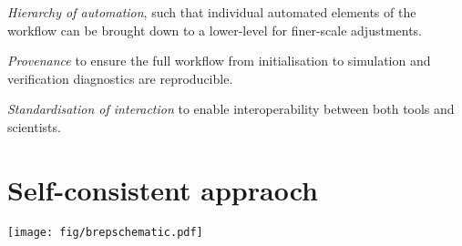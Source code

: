 \documentclass[a4paper, 10pt]{book}
\providecommand{\twod}{two-dimensional\xspace}
\providecommand{\threed}{three-dimensional\xspace}
\begin{document}
\begin{table}[!h]
\begin{minipage}{\columnwidth}
{\begin{tenetenum}[
labelindent=*,
style=multiline,
leftmargin=*,
]
      \emph{Hierarchy of automation}, such that individual automated elements of the workflow
      can be brought down to a lower-level for finer-scale adjustments.
\item \label{tenet:provenance} %
      \emph{Provenance} to ensure the full workflow from initialisation to simulation and
      verification diagnostics are reproducible.
\item \label{tenet:standard} %
      \emph{Standardisation of interaction} to enable interoperability between both tools and scientists.
\end{tenetenum}
\noindent \hrulefill
}
\end{minipage}
\caption{
The nine tenets of geophysical mesh generation.
Solutions to the spatial discretisation of geophysical model domains need to address these nine attributes
\cite[from][]{candybrep}.
}
\label{fig:tenets}
\end{table}
%

\chapter{Self-consistent appraoch}
%
\begin{figure*}[!h]
\vspace*{2mm}
\begin{center}
\texttt{[image: fig/brepschematic.pdf]}
\end{center}
\vspace{-3.8ex}
\caption{A schematic illustrating the approaches to unstructured mesh generation for geophysical models, highlighting
(a) the case in general
and
(b) the consistent approach introduced here,
with data pathways coloured in grey and blue, respectively
\citep[from][]{candybrep}.
%
The connecting red sections represent spatial discretisation processes $h$ \cref{h} and $v$ \cref{v}, that are fully constrained by the heterogeneous set of parameters provided to the left, and result in the discretisation to the right as an output.
%
Here for example, $h$ could be provided by an established Delaunay triangulation implementation to generate the \twod tessellation $\mathcal{T}_h$, and $v$ an advancing front algorithm to extrude this tessellation $\mathcal{T}_h$ out to
a \threed mesh $\mathcal{T}$.
}
\label{fig:schematic}
\vspace{-2ex}
\end{figure*}
\end{document}
